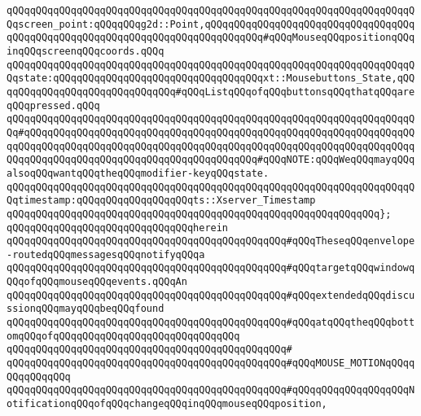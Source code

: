 \verb|qQQqqQQqqQQqqQQqqQQqqQQqqQQqqQQqqQQqqQQqqQQqqQQqqQQqqQQqqQQqqQQqqQQqqQQqscreen_point:qQQqqQQqg2d::Point,qQQqqQQqqQQqqQQqqQQqqQQqqQQqqQQqqQQqqQQqqQQqqQQqqQQqqQQqqQQqqQQqqQQqqQQqqQQqqQQq#qQQqMouseqQQqpositionqQQqinqQQqscreenqQQqcoords.qQQq|\newline
\verb|qQQqqQQqqQQqqQQqqQQqqQQqqQQqqQQqqQQqqQQqqQQqqQQqqQQqqQQqqQQqqQQqqQQqqQQqstate:qQQqqQQqqQQqqQQqqQQqqQQqqQQqqQQqqQQqxt::Mousebuttons_State,qQQqqQQqqQQqqQQqqQQqqQQqqQQqqQQq#qQQqListqQQqofqQQqbuttonsqQQqthatqQQqareqQQqpressed.qQQq|\newline
\verb|qQQqqQQqqQQqqQQqqQQqqQQqqQQqqQQqqQQqqQQqqQQqqQQqqQQqqQQqqQQqqQQqqQQqqQQq#qQQqqQQqqQQqqQQqqQQqqQQqqQQqqQQqqQQqqQQqqQQqqQQqqQQqqQQqqQQqqQQqqQQqqQQqqQQqqQQqqQQqqQQqqQQqqQQqqQQqqQQqqQQqqQQqqQQqqQQqqQQqqQQqqQQqqQQqqQQqqQQqqQQqqQQqqQQqqQQqqQQqqQQqqQQqqQQqqQQq#qQQqNOTE:qQQqWeqQQqmayqQQqalsoqQQqwantqQQqtheqQQqmodifier-keyqQQqstate.|\newline
\verb|qQQqqQQqqQQqqQQqqQQqqQQqqQQqqQQqqQQqqQQqqQQqqQQqqQQqqQQqqQQqqQQqqQQqqQQqtimestamp:qQQqqQQqqQQqqQQqqQQqts::Xserver_Timestamp|\newline
\verb|qQQqqQQqqQQqqQQqqQQqqQQqqQQqqQQqqQQqqQQqqQQqqQQqqQQqqQQqqQQqqQQq};|\newline
\newline
\verb|qQQqqQQqqQQqqQQqqQQqqQQqqQQqqQQqherein|\newline
\newline
\verb|qQQqqQQqqQQqqQQqqQQqqQQqqQQqqQQqqQQqqQQqqQQqqQQq#qQQqTheseqQQqenvelope-routedqQQqmessagesqQQqnotifyqQQqa|\newline
\verb|qQQqqQQqqQQqqQQqqQQqqQQqqQQqqQQqqQQqqQQqqQQqqQQq#qQQqtargetqQQqwindowqQQqofqQQqmouseqQQqevents.qQQqAn|\newline
\verb|qQQqqQQqqQQqqQQqqQQqqQQqqQQqqQQqqQQqqQQqqQQqqQQq#qQQqextendedqQQqdiscussionqQQqmayqQQqbeqQQqfound|\newline
\verb|qQQqqQQqqQQqqQQqqQQqqQQqqQQqqQQqqQQqqQQqqQQqqQQq#qQQqatqQQqtheqQQqbottomqQQqofqQQqqQQqqQQqqQQq|\verb|qQQqqQQqqQQqqQQq|\newline
\verb|qQQqqQQqqQQqqQQqqQQqqQQqqQQqqQQqqQQqqQQqqQQqqQQq#|\newline
\verb|qQQqqQQqqQQqqQQqqQQqqQQqqQQqqQQqqQQqqQQqqQQqqQQq#qQQqMOUSE_MOTIONqQQqqQQqqQQqqQQq|\newline
\verb|qQQqqQQqqQQqqQQqqQQqqQQqqQQqqQQqqQQqqQQqqQQqqQQq#qQQqqQQqqQQqqQQqqQQqNotificationqQQqofqQQqchangeqQQqinqQQqmouseqQQqposition,|\newline
